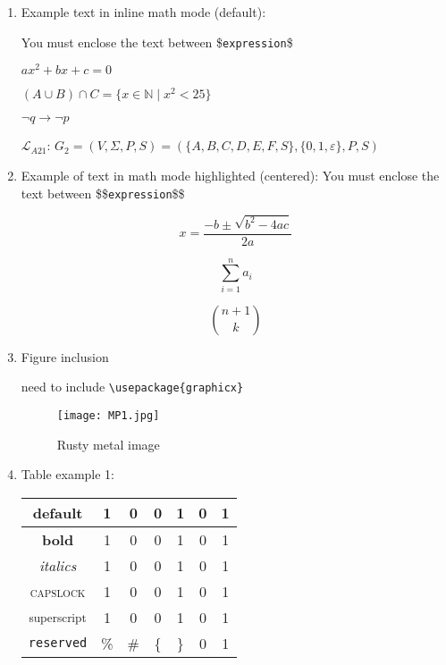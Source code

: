 \documentclass[12pt,a4paper]{article}
\begin{document}
\begin{enumerate}
\item Example text in inline math mode (default):

You must enclose the text between \$\verb|expression|\$

$ax^2 + bx +c = 0$

$(A \cup B) \cap C = \{x \in \mathbb{N} \mid x^2 < 25\}$

$\neg q \rightarrow \neg p$

$\mathcal{L}_{A21}$: $G_2=(V,\Sigma,P,S)=(\{A,B,C,D,E,F,S\},\{0,1, \varepsilon \},P,S)$
\item Example of text in math mode highlighted (centered):
You must enclose the text between \$\$\verb|expression|\$\$

$$ x=\frac{-b\pm\sqrt{b^2-4ac}}{2a} $$

$$\sum_{i=1}^{n} a_i$$

$$ \binom{n+1}{k} $$
\item Figure inclusion

        need to include \verb|\usepackage{graphicx}| 

\begin{figure}[ht]
\centering
\texttt{[image: MP1.jpg]}
\caption{Rusty metal image}
\end{figure}
\newpage
\item Table example 1:

\begin{table}[h]
\centering
\begin{tabular}{|c|c|c|c|c|c|c|}
\hline
 default & 1 & 0 & 0 & 1 & 0 & 1 \\ \hline
 \textbf{bold} & 1 & 0 & 0 & 1 & 0 & 1 \\
 \textit{italics} & 1 & 0 & 0 & 1 & 0 & 1 \\ 
  \textsc{capslock} & 1 & 0 & 0 & 1 & 0 & 1 \\
  \textsuperscript{superscript} & 1 & 0 & 0 & 1 & 0 & 1 \\
  \verb|reserved| & \% & \# & \{ & \} & 0 & 1 \\
\hline
\end{tabular}
\end{table}


\end{enumerate}
\end{document}
